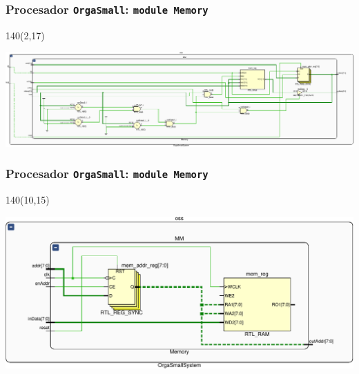 \documentclass[aspectratio=169]{beamer}
\begin{document}
\begin{frame}[fragile,t]
    \frametitle{Procesador \texttt{OrgaSmall}: \texttt{module Memory}}
    \begin{textblock}{140}(2,17)
    \begin{center}
    \includegraphics[scale=0.81]{pdf/schematicMM-crop.pdf}
    \end{center}
    \end{textblock}
\end{frame}

\begin{frame}[fragile,t]
    \frametitle{Procesador \texttt{OrgaSmall}: \texttt{module Memory}}
    \begin{textblock}{140}(10,15)
    \begin{center}
    \includegraphics[scale=0.74]{pdf/schematicMM2-crop.pdf}
    \end{center}
    \end{textblock}
\end{frame}
\end{document}
